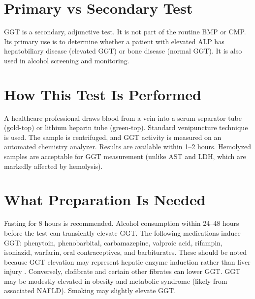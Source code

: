 \section*{Primary vs Secondary Test}
GGT is a secondary, adjunctive test. It is not part of the routine BMP or CMP. Its primary use is to determine whether a patient with elevated ALP has hepatobiliary disease (elevated GGT) or bone disease (normal GGT). It is also used in alcohol screening and monitoring.

\section*{How This Test Is Performed}
A healthcare professional draws blood from a vein into a serum separator tube (gold-top) or lithium heparin tube (green-top). Standard venipuncture technique is used. The sample is centrifuged, and GGT activity is measured on an automated chemistry analyzer. Results are available within 1--2 hours. Hemolyzed samples are acceptable for GGT measurement (unlike AST and LDH, which are markedly affected by hemolysis).

\section*{What Preparation Is Needed}
Fasting for 8 hours is recommended. Alcohol consumption within 24--48 hours before the test can transiently elevate GGT. The following medications induce GGT: phenytoin, phenobarbital, carbamazepine, valproic acid, rifampin, isoniazid, warfarin, oral contraceptives, and barbiturates. These should be noted because GGT elevation may represent hepatic enzyme induction rather than liver injury \cite{wallach2022interpretation}. Conversely, clofibrate and certain other fibrates can lower GGT. GGT may be modestly elevated in obesity and metabolic syndrome (likely from associated NAFLD). Smoking may slightly elevate GGT.

